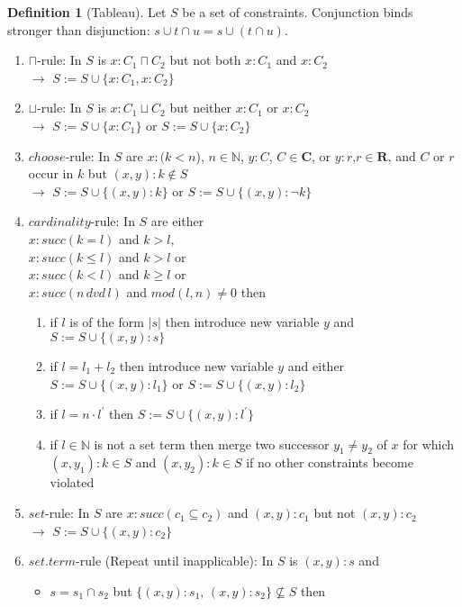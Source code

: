 \documentclass[a4paper,11pt]{scrartcl}
\theoremstyle{definition}
\newtheorem{mydef}{Definition}
\begin{document}
\begin{mydef}[Tableau]
Let $S$ be a set of constraints. Conjunction binds stronger than disjunction: $s\cup t\cap u = s\cup (t\cap u)$.
\begin{enumerate}
\item\label{cap} $\sqcap$-rule: In $S$ is $x:C_1\sqcap C_2$ but not both $x:C_1$ and $x:C_2$\\
$\rightarrow$ $S:=S\cup\{x:C_1, x:C_2\}$
\item\label{cup} $\sqcup$-rule: In $S$ is $x:C_1\sqcup C_2$ but neither $x:C_1$ or $x:C_2$\\
$\rightarrow$ $S:=S\cup\{x:C_1\}$ or $S:=S\cup\{x:C_2\}$
\item\label{choose}$choose$-rule: In $S$ are $x:(k<n$), $n\in\mathbb{N}$, $y:C$, $C\in\mathbf{C}$, or $y:r$,$r\in\mathbf{R}$, and $C$ or $r$ occur in $k$ but $(x,y):k\not\in S$\\
$\rightarrow$ $S:=S\cup\{(x,y):k\}$ or $S:=S\cup\{(x,y):\neg k\}$
\item\label{c}$cardinality$-rule: In $S$ are either \\$x:succ(k=l)$ and $k>l$, \\$x:succ(k\leq l)$ and $k>l$ or\\$x:succ(k<l)$ and $k\geq l$ or\\$x:succ(n\,dvd\,l)$ and $mod(l,n)\neq 0$ then
\begin{enumerate}
\item \label{simplesetterm}if $l$ is of the form $|s|$ then introduce new variable $y$ and $S:=S\cup\{(x,y):s\}$
\item \label{addition}if $l=l_1+l_2$ then introduce new variable $y$ and either $S:=S\cup\{(x,y):l_1\}$ or $S:=S\cup\{(x,y):l_2\}$
\item \label{multi}if $l=n\cdot l^\prime$ then $S:=S\cup\{(x,y):l^\prime\}$
\item \label{exceeded} if $l\in \mathbb{N}$ is not a set term then merge two successor $y_1\neq y_2$ of $x$ for which $(x,y_1):k\in S$ and $(x,y_2):k\in S$ if no other constraints become violated
\end{enumerate}
\item\label{s}$set$-rule: In $S$ are $x:succ(c_1\subseteq c_2)$ and $(x,y):c_1$ but not $(x,y):c_2$\\
$\rightarrow$ $S:=S\cup\{(x,y):c_2\}$
\item\label{repeat} $set.term$-rule (Repeat until inapplicable): In $S$ is $(x,y):s$ and
\begin{itemize}
\item $s=s_1\cap s_2$ but $\{(x,y):s_1,\,(x,y):s_2\}\not\subseteq S$ then\\

\end{itemize}
\end{enumerate}
\end{mydef}
\end{document}
